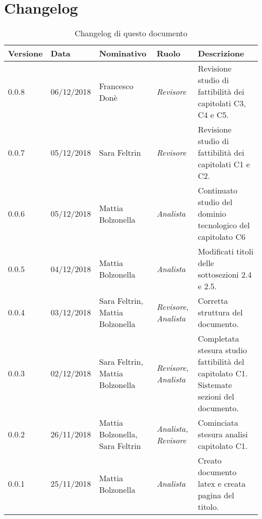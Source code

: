 \section{Changelog}
\begin{table}[tbph]
        \centering
        \begin{tabularx}{\textwidth}{|l|l|l|l|X|}
                \hline
                \textbf{Versione} & \textbf{Data} & \textbf{Nominativo}  & \textbf{Ruolo} & 
                \textbf{Descrizione}\\
                \hline \hline
                0.0.8 & 06/12/2018 & Francesco Donè & \textit{Revisore} & 
                Revisione studio di fattibilità dei capitolati C3, C4 e C5.\\
                \hline
                0.0.7 & 05/12/2018 & Sara Feltrin & \textit{Revisore} & 
                Revisione studio di fattibilità dei capitolati C1 e C2.\\
                \hline
                0.0.6 & 05/12/2018 & Mattia Bolzonella & \textit{Analista} & 
                Continuato studio del dominio tecnologico del capitolato C6\\
                \hline
                0.0.5 & 04/12/2018 & Mattia Bolzonella & \textit{Analista} & 
                Modificati titoli delle sottosezioni 2.4 e 2.5. \\
                \hline
                0.0.4 & 03/12/2018 & Sara Feltrin, Mattia Bolzonella 
                & \textit{Revisore, Analista} & Corretta struttura del documento. \\
                \hline
                0.0.3 & 02/12/2018 & Sara Feltrin, Mattia Bolzonella & \textit{Revisore, Analista}
                & Completata stesura studio fattibilità del capitolato C1.
                Sistemate sezioni del documento. \\
                \hline
                0.0.2 & 26/11/2018 & Mattia Bolzonella, Sara Feltrin & \textit{Analista, Revisore}
                & Cominciata stesura analisi capitolato C1.\\
                \hline
                0.0.1 & 25/11/2018 & Mattia Bolzonella & \textit{Analista}
                & Creato documento latex e creata pagina del titolo.\\
                \hline
                
        \end{tabularx}
        \caption{Changelog di questo documento}
\end{table}